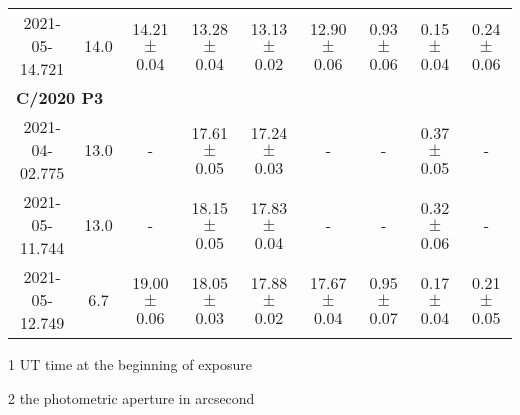 \begin{table}
\begin{threeparttable}
{\begin{tabular}{ccccccccc}
            2021-05-14.721 & 14.0 & 14.21 $\pm$ 0.04 & 13.28 $\pm$ 0.04 & 13.13 $\pm$ 0.02 & 12.90 $\pm$ 0.06 & 0.93 $\pm$ 0.06 & 0.15 $\pm$ 0.04 & 0.24 $\pm$ 0.06 \\
            \multicolumn{9}{l}{\textbf{C/2020 P3}} \\
            2021-04-02.775 & 13.0 & - & 17.61 $\pm$ 0.05 & 17.24 $\pm$ 0.03 & - & - & 0.37 $\pm$ 0.05 & - \\
            2021-05-11.744 & 13.0 & - & 18.15 $\pm$ 0.05 & 17.83 $\pm$ 0.04 & - & - & 0.32 $\pm$ 0.06 & - \\
            2021-05-12.749 & 6.7 & 19.00 $\pm$ 0.06 & 18.05 $\pm$ 0.03 & 17.88 $\pm$ 0.02 & 17.67 $\pm$ 0.04 & 0.95 $\pm$ 0.07 & 0.17 $\pm$ 0.04 & 0.21 $\pm$ 0.05 \\
            \bottomrule
        \end{tabular}
        }
        \begin{tablenotes}
            \item[1] UT time at the beginning of exposure
            \item[2] the photometric aperture in arcsecond
        \end{tablenotes}
    \end{threeparttable}
\end{table}

